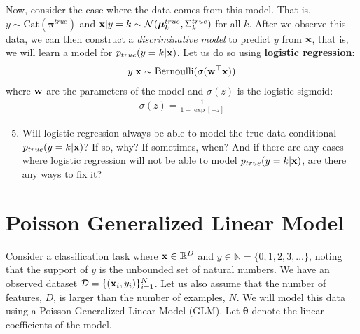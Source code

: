 \documentclass[11pt]{article}
\begin{document}
\noindent Now, consider the case where the data comes from this model.
That is, $y \sim \text{Cat}(\bm{\pi}^{true})$ and ${\mathbf x}|y=k \sim \mathcal{N}(\bm{\mu}_k^{true},\Sigma_k^{true})$ for all $k$.
After we observe this data, we can then construct a \textit{discriminative model} to predict $y$ from ${\mathbf x}$, that is, we will learn a model for $p_{true}(y=k|{\mathbf x})$. Let us do so using \textbf{logistic regression}:
\begin{align*}
    y|{\mathbf x} \sim \text{Bernoulli}(\sigma({\mathbf w}^\top {\mathbf x}))
\end{align*}
where ${\mathbf w}$ are the parameters of the model and $\sigma(z)$ is the logistic sigmoid:
\begin{align*}
    \sigma(z) = \frac{1}{1+\exp[-z]}
\end{align*}

\begin{enumerate}[label=(\Alph*)]
\setcounter{enumi}{4}

    \item Will logistic regression always be able to model the true data conditional $p_{true}(y=k|{\mathbf x})$? If so, why? If sometimes, when? And if there are any cases where logistic regression will not be able to model $p_{true}(y=k|{\mathbf x})$, are there any ways to fix it?

\end{enumerate}

\newpage
\section{Poisson Generalized Linear Model}

Consider a classification task where ${\mathbf x} \in \mathbb{R}^D$ and $y \in \mathbb{N} = \{0,1,2,3,\dots\}$, noting that the support of $y$ is the unbounded set of natural numbers. We have an observed dataset $\mathcal{D} = \{({\mathbf x}_i,y_i)\}_{i=1}^N$. Let us also assume that the number of features, $D$, is larger than the number of examples, $N$. We will model this data using a Poisson Generalized Linear Model (GLM). Let $\boldsymbol \theta$ denote the linear coefficients of the model.
\end{document}
